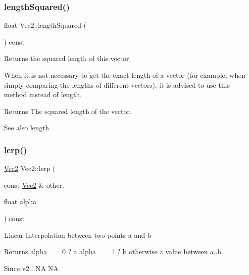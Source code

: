 \subsubsection{\texorpdfstring{length\+Squared()}{lengthSquared()}\hspace{0.1cm}{\footnotesize\ttfamily [2/2]}}
{\footnotesize\ttfamily float Vec2\+::length\+Squared (\begin{DoxyParamCaption}{ }\end{DoxyParamCaption}) const\hspace{0.3cm}{\ttfamily [inline]}}

Returns the squared length of this vector.

When it is not necessary to get the exact length of a vector (for example, when simply comparing the lengths of different vectors), it is advised to use this method instead of length.

\begin{DoxyReturn}{Returns}
The squared length of the vector.
\end{DoxyReturn}
\begin{DoxySeeAlso}{See also}
\hyperlink{classVec2_af9ebf7c8888fd5df9514e6d519b99fb2}{length} 
\end{DoxySeeAlso}
\mbox{\label{classVec2_ac0076d01a5bbbaa5718257c24ee93e06}} 
\subsubsection{\texorpdfstring{lerp()}{lerp()}\hspace{0.1cm}{\footnotesize\ttfamily [1/2]}}
{\footnotesize\ttfamily \hyperlink{classVec2}{Vec2} Vec2\+::lerp (\begin{DoxyParamCaption}\item[{const \hyperlink{classVec2}{Vec2} \&}]{other,  }\item[{float}]{alpha }\end{DoxyParamCaption}) const\hspace{0.3cm}{\ttfamily [inline]}}

Linear Interpolation between two points a and b \begin{DoxyReturn}{Returns}
alpha == 0 ? a alpha == 1 ? b otherwise a value between a..b 
\end{DoxyReturn}
\begin{DoxySince}{Since}
v2..  NA  NA 
\end{DoxySince}
\mbox{\label{classVec2_ac0076d01a5bbbaa5718257c24ee93e06}} 
